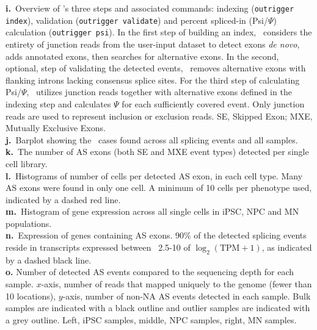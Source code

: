 \begin{minipage}{\textwidth}
{\textbf{i.}~Overview of \outrigger's three steps and associated commands: indexing (\texttt{outrigger index}), validation (\texttt{outrigger validate}) and percent spliced-in (Psi/$\Psi$) calculation (\texttt{outrigger psi}). In the first step of building an index, \outrigger\, considers the entirety of junction reads from the user-input dataset to detect exons \emph{de novo}, adds annotated exons, then searches for alternative exons. In the second, optional, step of validating the detected events, \outrigger\, removes alternative exons with flanking introns lacking consensus splice sites. For the third step of calculating Psi/$\Psi$, \outrigger\, utilizes junction reads together with alternative exons defined in the indexing step and calculates $\Psi$ for each sufficiently covered event. Only junction reads are used to represent inclusion or exclusion reads. SE, Skipped Exon; MXE, Mutually Exclusive Exons.\\
\textbf{j.}~Barplot showing the \outrigger\, cases found across all splicing events and all samples.\\
\textbf{k.}~The number of AS exons (both SE and MXE event types) detected per single cell library. \\
\textbf{l.}~Histograms of number of cells per detected AS exon, in each cell type. Many AS exons were found in only one cell. A minimum of 10 cells per phenotype used, indicated by a dashed red line.\\
\textbf{m.}~Histogram of gene expression across all single cells in iPSC, NPC and MN populations.\\
\textbf{n.}~Expression of genes containing AS exons. 90\% of the detected splicing events reside in transcripts expressed between ~2.5-10 of $\log_2(\mathrm{TPM}+1)$, as indicated by a dashed black line. \\
\textbf{o.} Number of detected AS events compared to the sequencing depth for each sample. $x$-axis, number of reads that mapped uniquely to the genome (fewer than 10 locations), $y$-axis, number of non-NA AS events detected in each sample. Bulk samples are indicated with a black outline and outlier samples are indicated with a grey outline. Left, iPSC samples, middle, NPC samples, right, MN samples.
}
\label{fig:quality_control}
\end{minipage}






